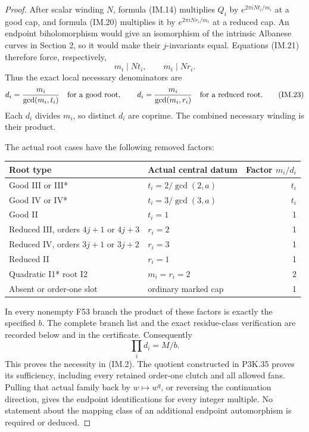 \begin{proof}
After scalar winding \(N\), formula (IM.14) multiplies \(Q_i\)
by \(e^{2\pi iNt_i/m_i}\) at a good cap, and formula (IM.20)
multiplies it by \(e^{2\pi iNr_i/m_i}\) at a reduced cap. An
endpoint biholomorphism would give an isomorphism of the intrinsic
Albanese curves in Section 2, so it would make their \(j\)-invariants
equal. Equations (IM.21) therefore force, respectively,
\[
 m_i\mid Nt_i,
 \qquad m_i\mid Nr_i.                                \tag{IM.22}
\]
Thus the exact local necessary denominators are
\[
 d_i=\frac{m_i}{\gcd(m_i,t_i)}\quad\hbox{for a good root},
 \qquad
 d_i=\frac{m_i}{\gcd(m_i,r_i)}\quad\hbox{for a reduced root}.
                                                               \tag{IM.23}
\]
Each \(d_i\) divides \(m_i\), so distinct \(d_i\) are coprime.
The combined necessary winding is their product.

The actual root cases have the following removed factors:

\begin{longtable}[]{@{}llr@{}}
\toprule\noalign{}
Root type & Actual central datum & Factor \(m_i/d_i\) \\
\midrule\noalign{}
\endhead
\bottomrule\noalign{}
\endlastfoot
Good III or III* & \(t_i=2/\gcd(2,a)\) & \(t_i\) \\
Good IV or IV* & \(t_i=3/\gcd(3,a)\) & \(t_i\) \\
Good II & \(t_i=1\) & 1 \\
Reduced III, orders \(4j+1\) or \(4j+3\) & \(r_i=2\) & 1 \\
Reduced IV, orders \(3j+1\) or \(3j+2\) & \(r_i=3\) & 1 \\
Reduced II & \(r_i=1\) & 1 \\
Quadratic I1* root I2 & \(m_i=r_i=2\) & 2 \\
Absent or order-one slot & ordinary marked cap & 1 \\
\end{longtable}

In every nonempty F53 branch the product of these factors is exactly
the specified \(b\). The complete branch list and the exact
residue-class verification are recorded below and in the certificate.
Consequently
\[
                       \prod_i d_i=M/b.                \tag{IM.24}
\]
This proves the necessity in (IM.2). The quotient constructed in
P3K.35 proves its sufficiency, including every retained order-one
clutch and all allowed fans. Pulling that actual family back by
\(w\mapsto w^q\), or reversing the continuation direction,
gives the endpoint identifications for every integer multiple.
No statement about the mapping class of an additional endpoint
automorphism is required or deduced.


\end{proof}
